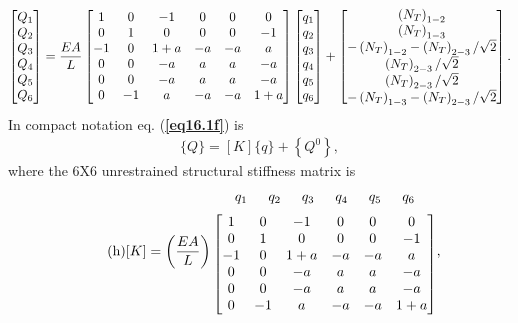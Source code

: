 \documentclass{AeroStructure-ERJohnson}
\begin{document}
\begin{example}
\begin{align}
\left[\begin{array}{@{}l@{}}Q_{1} \\Q_{2} \\Q_{3} \\Q_{4} \\Q_{5} \\Q_{6}\end{array}\right]=\frac{E A}{L}\left[\begin{array}{@{}cccccc@{}}1 & 0 & -1 & 0 & 0 & 0 \\0 & 1 & 0 & 0 & 0 & -1 \\-1 & 0 & 1+a & -a & -a & a \\0 & 0 & -a & a & a & -a \\0 & 0 & -a & a & a & -a \\0 & -1 & a & -a & -a & 1+a\end{array}\right]\left[\begin{array}{@{}l@{}}q_{1} \\q_{2} \\q_{3} \\q_{4} \\q_{5} \\q_{6}\end{array}\right]+\left[\begin{array}{@{}c@{}}\left(N_{T}\right)_{1-2} \\\left(N_{T}\right)_{1-3} \\-\left(N_{T}\right)_{1-2}-\left(N_{T}\right)_{2-3} / \sqrt{2} \\\left(N_{T}\right)_{2-3} / \sqrt{2} \\\left(N_{T}\right)_{2-3} / \sqrt{2} \\-\left(N_{T}\right)_{1-3}-\left(N_{T}\right)_{2-3} / \sqrt{2}\end{array}\right].
\end{align}
In compact notation eq. (\textbf{\ref{eq16.1f}}) is
\begin{align}\label{eq16.1g}\tag{g}
\{Q\}=[K]\{q\}+\left\{Q^{0}\right\},
\end{align}
where the 6X6 unrestrained structural stiffness matrix is\pagebreak
\begin{align}\label{eq16.1h}\tag{h}
[K]=\left(\frac{E A}{L}\right)
\begin{array}{@{}c@{}}
{\arraycolsep=7.5pt\begin{array}{@{}cccccc@{}}
q_{1} & q_{2} & q_{3} & q_{4} & q_{5} & q_{6}\end{array}}\\[6pt]
\left[\begin{array}{@{}cccccc@{}}1 & 0 & -1 & 0 & 0 & 0 \\0 & 1 & 0 & 0 & 0 & -1 \\-1 & 0 & 1+a & -a & -a & a \\0 & 0 & -a & a & a & -a \\0 & 0 & -a & a & a & -a \\0 & -1 & a & -a & -a & 1+a\end{array}\right]\end{array},

\end{align}
\end{example}
\end{document}
